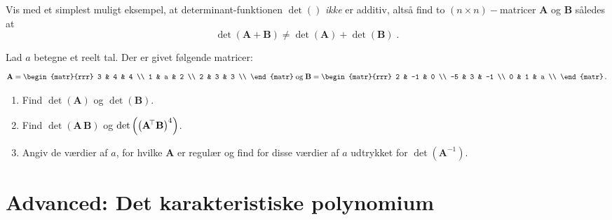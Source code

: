 \begin{exercise}
Vis med et simplest muligt eksempel, at determinant-funktionen $\det( )$ {\textit{ikke}} er additiv, altså find to $(n \times n)-$matricer $\mathbf{A}$ og $\mathbf{B}$
således at
\begin{equation}
\det(\mathbf{A} + \mathbf{B}) \neq \det(\mathbf{A}) + \det(\mathbf{B}) \;.
\end{equation}
\end{exercise}


\begin{exercise}  \label{tn5.exercLA39}
Lad $a$ betegne et reelt tal. Der er  givet følgende matricer:
\begin{equation}
\mathbf{A} = \begin{matr}{rrr}
             3 & 4 & 4 \\
             1 & a & 2 \\
             2 & 3 & 3 \\
           \end{matr} \; \textrm{og} \; \mathbf{B} = \begin{matr}{rrr}
                                                   2 & -1 & 0 \\
                                                   -5 & 3 & -1 \\
                                                   0 & 1 & a \\
                                                 \end{matr} \,.
\end{equation}
\begin{enumerate}
\item Find $\det(\mathbf{A})$ og $\det(\mathbf{B})$.
\item Find $\det(\mathbf{A\,B})$ og $\det\left(\left(\mathbf{A}\hspace*{-.6mm}^{\top} \mathbf{B}\right)^{4}\right)$.
\item Angiv de værdier af $a$, for hvilke $\mathbf{A}$ er regulær og find for disse værdier af $a$ udtrykket for
$\det(\mathbf{A}^{-1})$.
\end{enumerate}
\end{exercise}


\section{Advanced: Det karakteristiske polynomium} \label{tn5.secKarakterPol}

